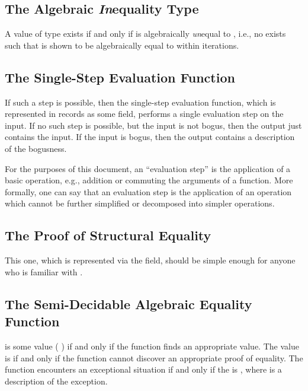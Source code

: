 \documentclass{report}
\begin{document}
\subsection{The Algebraic \emph{In}equality Type}
A value of type     exists if and only if  is algebraically \emph{un}equal to , i.e., no  exists such that  is shown to be algebraically equal to  within  iterations.

\subsection{The Single-Step Evaluation Function}
If such a step is possible, then the single-step evaluation function, which is represented in  records as some  field, performs a single evaluation step on the input.  If no such step is possible, but the input is not bogus, then the output just contains the input.  If the input is bogus, then the output contains a description of the bogusness.

For the purposes of this document, an ``evaluation step'' is the application of a basic operation, e.g., addition or commuting the arguments of a function.  More formally, one can say that an evaluation step is the application of an operation which cannot be further simplified or decomposed into simpler operations.

\subsection{The Proof of Structural Equality}
This one, which is represented via the  field, should be simple enough for anyone who is familiar with .

\subsection{The Semi-Decidable Algebraic Equality Function}
    is some value  \AgdaSymbol( \AgdaSymbol) if and only if the  function finds an appropriate value.  The  value is   if and only if the function cannot discover an appropriate proof of equality.  The function encounters an exceptional situation if and only if the  is  , where  is a description of the exception.
\end{document}
